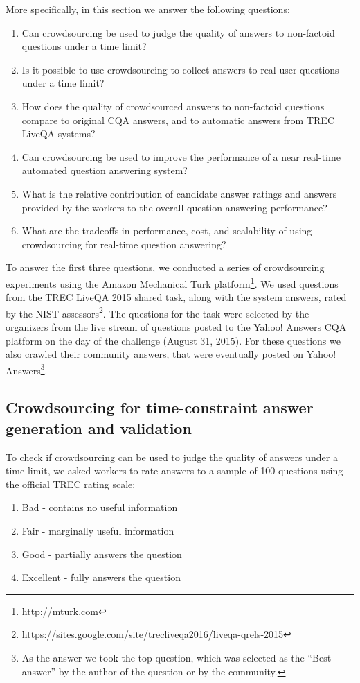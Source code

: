 More specifically, in this section we answer the following questions:
\begin{enumerate}
\item Can crowdsourcing be used to judge the quality of answers to non-factoid questions under a time limit?
\item Is it possible to use crowdsourcing to collect answers to real user questions under a time limit?
\item How does the quality of crowdsourced answers to non-factoid questions compare to original CQA answers, and to automatic answers from TREC LiveQA systems?
\item Can crowdsourcing be used to improve the performance of a near real-time automated question answering system?
\item What is the relative contribution of candidate answer ratings and answers provided by the workers to the overall question answering performance?
\item What are the tradeoffs in performance, cost, and scalability of using crowdsourcing for real-time question answering?
\end{enumerate}

To answer the first three questions, we conducted a series of crowdsourcing experiments using the Amazon Mechanical Turk platform\footnote{http://mturk.com}.
We used questions from the TREC LiveQA 2015 shared task, along with the system answers, rated by the NIST assessors\footnote{https://sites.google.com/site/trecliveqa2016/liveqa-qrels-2015}.
The questions for the task were selected by the organizers from the live stream of questions posted to the Yahoo! Answers CQA platform on the day of the challenge (August 31, 2015).
For these questions we also crawled their community answers, that were eventually posted on Yahoo! Answers\footnote{As the answer we took the top question, which was selected as the ``Best answer'' by the author of the question or by the community.}.

\subsection{Crowdsourcing for time-constraint answer generation and validation}
\label{section:crowdsourcing:approach:experiments}

To check if crowdsourcing can be used to judge the quality of answers under a time limit, we asked workers to rate answers to a sample of 100 questions using the official TREC rating scale:
\begin{enumerate}
\item Bad - contains no useful information
\item Fair - marginally useful information
\item Good - partially answers the question
\item Excellent - fully answers the question
\end{enumerate}


